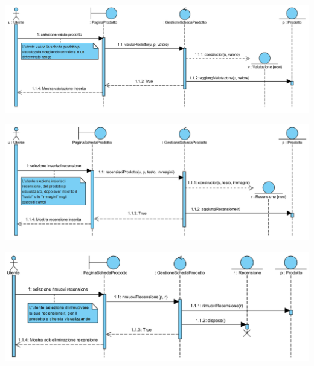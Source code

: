\begin{landscape}
\begin{center}
			\includegraphics[width=\linewidth]{assets/visualParadigm/sequenza/inserimentoValutazione}
\end{center}
\end{landscape}

\begin{landscape}
\begin{center}
			\includegraphics[width=\linewidth]{assets/visualParadigm/sequenza/inserimentoRecensione}
\end{center}
\end{landscape}

\begin{landscape}
\begin{center}
			\includegraphics[width=\linewidth]{assets/visualParadigm/sequenza/rimuoviRecensione}
\end{center}
\end{landscape}

